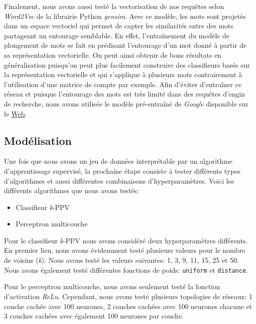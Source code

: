 Finalement, nous avons aussi testé la vectorisation de nos requêtes selon \textit{Word2Vec} de la librairie Python \textit{gensim}.
Avec ce modèle, les mots sont projetés dans un espace vectoriel qui permet de capter les similarités entre des mots partageant un entourage semblable. En effet, l'entraînement du modèle de plongement de mots se fait en prédisant l'entourage d'un mot donné à partir de sa représentation vectorielle. On peut ainsi obtenir de bons résultats en généralisation puisqu'on peut plus facilement construire des classifieurs basés sur la représentation vectorielle et qui s'applique à plusieurs mots contrairement à l'utilisation d'une matrice de compte par exemple. Afin d'éviter d'entraîner ce réseau et puisque l'entourage des mots est très limité dans des requêtes d'engin de recherche, nous avons utilisée le modèle pré-entraîné de \emph{Google} disponible sur le \href{https://code.google.com/archive/p/word2vec/}{Web}.


\subsection{Modélisation}

Une fois que nous avons un jeu de données interprétable par un algorithme d'apprentissage supervisé, la prochaine étape consiste à tester différents types d'algorithmes et aussi différentes combinaisons d'hyperparamètres. Voici les différents algorithmes que nous avons testés:

\begin{itemize}
  \item Classifieur \textit{k}-PPV
  \item Perceptron multicouche
\end{itemize}

Pour le classifieur \textit{k}-PPV nous avons considéré deux hyperparamètres différents. En premier lieu, nous avons évidemment testé plusieurs valeurs pour le nombre de voisins (\textit{k}). Nous avons testé les valeurs suivantes: 1, 3, 9, 11, 15, 25 et 50. 
Nous avons également testé différentes fonctions de poids: \texttt{uniform} et \texttt{distance}.

Pour le perceptron multicouche, nous avons seulement testé la fonction d'activation \textit{ReLu}. Cependant, nous avons testé plusieurs topologies de réseaux: 1 couche cachée avec 100 neurones, 2 couches cachées avec 100 neurones chacune et 3 couches cachées avec également 100 neurones par couche.
\break

